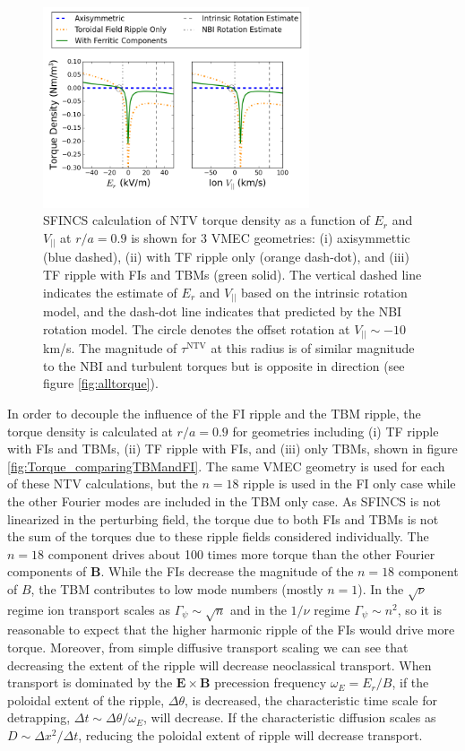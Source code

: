 \documentclass[aip, pop, preprint]{revtex4-1}
\numberwithin{figure}{section}
\numberwithin{equation}{section}
\begin{document}
\begin{figure}[h!]
\centering
\includegraphics[width=0.7\textwidth]{Torque_ErandV.png}
\caption{\label{fig:Torque_ErandV} SFINCS calculation of NTV torque density as a function of $E_r$ and $V_{||}$ at $r/a = 0.9$ is shown for 3 VMEC geometries: (i) axisymmettic (blue dashed), (ii) with TF ripple only (orange dash-dot), and (iii) TF ripple with FIs and TBMs (green solid). The vertical dashed line indicates the estimate of $E_r$ and $V_{||}$ based on the intrinsic rotation model, and the dash-dot line indicates that predicted by the NBI rotation model. The circle denotes the offset rotation at $V_{||} \sim -10$ km/s. The magnitude of $\tau^{\text{NTV}}$ at this radius is of similar magnitude to the NBI and turbulent torques but is opposite in direction (see figure \ref{fig:alltorque}).}
\end{figure}

In order to decouple the influence of the FI ripple and the TBM ripple, the torque density is calculated at $r/a = 0.9$ for geometries including (i) TF ripple with FIs and TBMs, (ii) TF ripple with FIs, and (iii) only TBMs, shown in figure \ref{fig:Torque_comparingTBMandFI}. The same VMEC geometry is used for each of these NTV calculations, but the $n =18$ ripple is used in the FI only case while the other Fourier modes are included in the TBM only case. As SFINCS is not linearized in the perturbing field, the torque due to both FIs and TBMs is not the sum of the torques due to these ripple fields considered individually. The $n = 18$ component drives about 100 times more torque than the other Fourier components of $\bm{B}$.  While the FIs decrease the magnitude of the $n =18$ component of $B$, the TBM contributes to low mode numbers (mostly $n = 1$). In the $\sqrt{\nu}$ regime ion transport scales as $\Gamma_{\psi} \sim \sqrt{n}$ and in the $1/\nu$ regime $\Gamma_{\psi} \sim n^2$,\cite{Shaing2010} so it is reasonable to expect that the higher harmonic ripple of the FIs would drive more torque. Moreover, from simple diffusive transport scaling we can see that decreasing the extent of the ripple will decrease neoclassical transport. When transport is dominated by the $\bm{E} \times \bm{B}$ precession frequency $\omega_E = E_r/B$, if the poloidal extent of the ripple, $\Delta \theta$, is decreased, the characteristic time scale for detrapping, $\Delta t \sim \Delta \theta/ \omega_E$, will decrease. If the characteristic diffusion scales as $D \sim \Delta x^2/\Delta t$, reducing the poloidal extent of ripple will decrease transport. 
\end{document}
